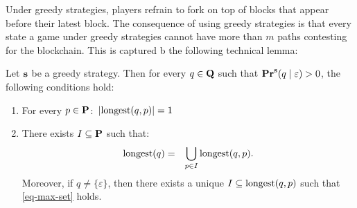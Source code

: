 Under greedy strategies, players refrain to fork on top of blocks that appear before their latest block.
The consequence of using 
greedy strategies is that every state a game under greedy strategies cannot have more than $m$ paths contesting for the blockchain. This is captured b the following 
technical lemma: 
\begin{mylem}\label{lem-length-greedy}
Let $\mathbf{s}$ be a greedy strategy. Then for every $q \in \mathbf{Q}$ such that $\mathbf{Pr}^{\mathbf{s}}(q \mid \varepsilon) > 0$, the following conditions hold:
\begin{enumerate}
\item For every $p \in \mathbf{P}$$:$ $|{\text{\rm longest}}(q,p)| = 1$ 

\item There exists $I \subseteq \mathbf{P}$ such that$:$
\begin{eqnarray}\label{eq-max-set}
{\text{\rm longest}}(q) & = & \bigcup_{p \in I} {\text{\rm longest}}(q,p).
\end{eqnarray}
Moreover, if $q \neq \{\varepsilon\}$, then there exists a unique $I \subseteq {\text{\rm longest}}(q,p)$ such that \eqref{eq-max-set} holds.
\end{enumerate}
\end{mylem}

